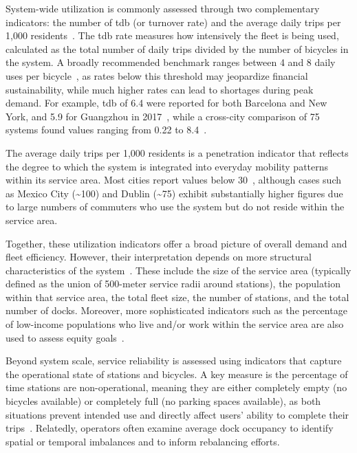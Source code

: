     System-wide utilization is commonly assessed through two complementary indicators: the number of \ac{tdb} (or turnover rate) and the average daily trips per 1,000 residents~\cite{Waldner2025, Yanocha2018, Yahya2017}. The \ac{tdb} rate measures how intensively the fleet is being used, calculated as the total number of daily trips divided by the number of bicycles in the system. A broadly recommended benchmark ranges between 4 and 8 daily uses per bicycle~\cite{Yanocha2018}, as rates below this threshold may jeopardize financial sustainability, while much higher rates can lead to shortages during peak demand. For example, \ac{tdb} of 6.4 were reported for both Barcelona and New York, and 5.9 for Guangzhou in 2017~\cite{Yanocha2018}, while a cross-city comparison of 75 systems found values ranging from 0.22 to 8.4~\cite{deChardon2017}.

    The average daily trips per 1,000 residents is a penetration indicator that reflects the degree to which the system is integrated into everyday mobility patterns within its service area. Most cities report values below 30~\cite{Yanocha2018}, although cases such as Mexico City (\textasciitilde100) and Dublin (\textasciitilde75) exhibit substantially higher figures due to large numbers of commuters who use the system but do not reside within the service area.

    Together, these utilization indicators offer a broad picture of overall demand and fleet efficiency. However, their interpretation depends on more structural characteristics of the system~\cite{Yanocha2018}. These include the size of the service area (typically defined as the union of 500-meter service radii around stations), the population within that service area, the total fleet size, the number of stations, and the total number of docks. Moreover, more sophisticated indicators such as the percentage of low-income populations who live and/or work within the service area are also used to assess equity goals~\cite{Yanocha2018}.

    Beyond system scale, service reliability is assessed using indicators that capture the operational state of stations and bicycles. A key measure is the percentage of time stations are non-operational, meaning they are either completely empty (no bicycles available) or completely full (no parking spaces available), as both situations prevent intended use and directly affect users’ ability to complete their trips~\cite{Santander2022, Rossow2018}. Relatedly, operators often examine average dock occupancy to identify spatial or temporal imbalances and to inform rebalancing efforts.
    
